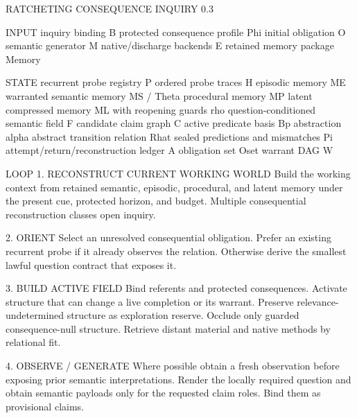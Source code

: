\documentclass[
]{article}
\newenvironment{Shaded}{}{}
\newcommand{\NormalTok}[1]{#1}
\begin{document}
\begin{Shaded}
\begin{Highlighting}[]
\NormalTok{RATCHETING CONSEQUENCE INQUIRY 0.3}

\NormalTok{INPUT}
\NormalTok{    inquiry binding B}
\NormalTok{    protected consequence profile Phi}
\NormalTok{    initial obligation O}
\NormalTok{    semantic generator M}
\NormalTok{    native/discharge backends E}
\NormalTok{    retained memory package Memory}

\NormalTok{STATE}
\NormalTok{    recurrent probe registry P}
\NormalTok{    ordered probe traces H}
\NormalTok{    episodic memory ME}
\NormalTok{    warranted semantic memory MS / Theta}
\NormalTok{    procedural memory MP}
\NormalTok{    latent compressed memory ML with reopening guards rho}
\NormalTok{    question-conditioned semantic field F}
\NormalTok{    candidate claim graph C}
\NormalTok{    active predicate basis Bp}
\NormalTok{    abstraction alpha}
\NormalTok{    abstract transition relation Rhat}
\NormalTok{    sealed predictions and mismatches Pi}
\NormalTok{    attempt/return/reconstruction ledger A}
\NormalTok{    obligation set Oset}
\NormalTok{    warrant DAG W}

\NormalTok{LOOP}
\NormalTok{1. RECONSTRUCT CURRENT WORKING WORLD}
\NormalTok{   Build the working context from retained semantic, episodic, procedural,}
\NormalTok{   and latent memory under the present cue, protected horizon, and budget.}
\NormalTok{   Multiple consequential reconstruction classes open inquiry.}

\NormalTok{2. ORIENT}
\NormalTok{   Select an unresolved consequential obligation.}
\NormalTok{   Prefer an existing recurrent probe if it already observes the relation.}
\NormalTok{   Otherwise derive the smallest lawful question contract that exposes it.}

\NormalTok{3. BUILD ACTIVE FIELD}
\NormalTok{   Bind referents and protected consequences.}
\NormalTok{   Activate structure that can change a live completion or its warrant.}
\NormalTok{   Preserve relevance-undetermined structure as exploration reserve.}
\NormalTok{   Occlude only guarded consequence-null structure.}
\NormalTok{   Retrieve distant material and native methods by relational fit.}

\NormalTok{4. OBSERVE / GENERATE}
\NormalTok{   Where possible obtain a fresh observation before exposing prior semantic}
\NormalTok{   interpretations. Render the locally required question and obtain semantic}
\NormalTok{   payloads only for the requested claim roles. Bind them as provisional claims.}


\end{Highlighting}
\end{Shaded}
\end{document}
